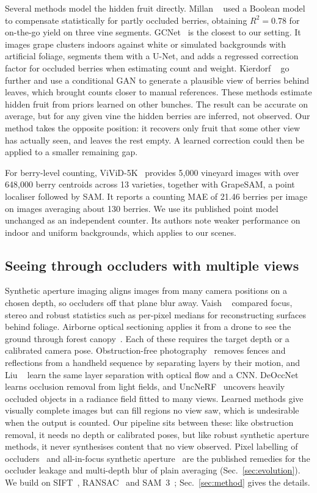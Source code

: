 Several methods model the hidden fruit directly. Millan \etal~\cite{millan2018} used a Boolean model to compensate statistically for partly occluded berries, obtaining $R^2=0.78$ for on-the-go yield on three vine segments. GCNet~\cite{quinones2025gcnet} is the closest to our setting. It images grape clusters indoors against white or simulated backgrounds with artificial foliage, segments them with a U-Net, and adds a regressed correction factor for occluded berries when estimating count and weight. Kierdorf \etal~\cite{kierdorf2022} go further and use a conditional GAN to generate a plausible view of berries behind leaves, which brought counts closer to manual references. These methods estimate hidden fruit from priors learned on other bunches. The result can be accurate on average, but for any given vine the hidden berries are inferred, not observed. Our method takes the opposite position: it recovers only fruit that some other view has actually seen, and leaves the rest empty. A learned correction could then be applied to a smaller remaining gap.

For berry-level counting, ViViD-5K~\cite{tong2026vivid} provides 5,000 vineyard images with over 648,000 berry centroids across 13 varieties, together with GrapeSAM, a point localiser followed by SAM. It reports a counting MAE of 21.46 berries per image on images averaging about 130 berries. We use its published point model unchanged as an independent counter. Its authors note weaker performance on indoor and uniform backgrounds, which applies to our scenes.

\subsection{Seeing through occluders with multiple views}
Synthetic aperture imaging aligns images from many camera positions on a chosen depth, so occluders off that plane blur away. Vaish \etal~\cite{vaish2006} compared focus, stereo and robust statistics such as per-pixel medians for reconstructing surfaces behind foliage. Airborne optical sectioning applies it from a drone to see the ground through forest canopy~\cite{kurmi2018}. Each of these requires the target depth or a calibrated camera pose. Obstruction-free photography~\cite{xue2015} removes fences and reflections from a handheld sequence by separating layers by their motion, and Liu \etal~\cite{liu2020obstruct} learn the same layer separation with optical flow and a CNN. DeOccNet~\cite{wang2020} learns occlusion removal from light fields, and UncNeRF~\cite{ma2026uncnerf} uncovers heavily occluded objects in a radiance field fitted to many views. Learned methods give visually complete images but can fill regions no view saw, which is undesirable when the output is counted. Our pipeline sits between these: like obstruction removal, it needs no depth or calibrated poses, but like robust synthetic aperture methods, it never synthesises content that no view observed. Pixel labelling of occluders~\cite{pei2013} and all-in-focus synthetic aperture~\cite{yang2014} are the published remedies for the occluder leakage and multi-depth blur of plain averaging (Sec.~\ref{sec:evolution}). We build on SIFT~\cite{lowe2004}, RANSAC~\cite{fischler1981} and SAM~3~\cite{carion2025}; Sec.~\ref{sec:method} gives the details.
